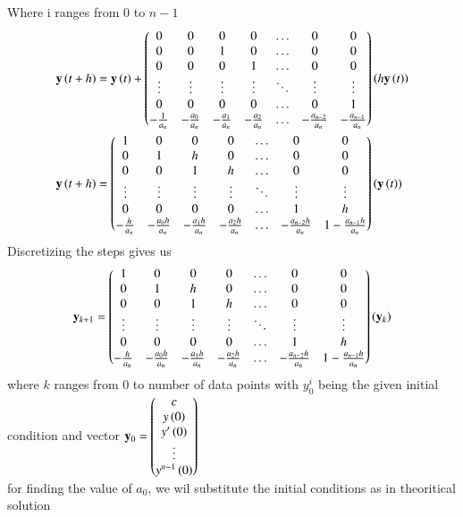 \documentclass[journal]{IEEEtran}
\begin{document}
Where i ranges from 0 to $n-1$\\
\begin{align}
	\mathbf{y}\left(t+h\right) &= \mathbf{y}\left(t\right) + \begin{pmatrix}0 & 0 & 0 & 0 & \dots & 0 & 0\\ 0 & 0 & 1 & 0 & \dots & 0 & 0\\0 & 0 & 0 & 1 & \dots & 0 & 0\\\vdots & \vdots & \vdots & \vdots& \ddots & \vdots & \vdots\\
	0 & 0 & 0 & 0 & \dots & 0 & 1\\-\frac{1}{a_n} & -\frac{a_0}{a_n} & -\frac{a_1}{a_n} & -\frac{a_2}{a_n} & \dots & -\frac{a_{n-2}}{a_n} & -\frac{a_{n-1}}{a_n}\end{pmatrix}\left(h\mathbf{y}\left(t\right)\right)\\
	\mathbf{y}\left(t+h\right) &= \begin{pmatrix}1 & 0 & 0 & 0 & \dots & 0 & 0\\ 0 & 1 & h & 0 & \dots & 0 & 0\\0 & 0 & 1 & h & \dots & 0 & 0\\\vdots & \vdots & \vdots & \vdots& \ddots & \vdots & \vdots\\
	0 & 0 & 0 & 0 & \dots & 1 & h\\-\frac{h}{a_n} & -\frac{a_0h}{a_n} & -\frac{a_1h}{a_n} & -\frac{a_2h}{a_n} & \dots & -\frac{a_{n-2}h}{a_n} & 1-\frac{a_{n-1}h}{a_n}\end{pmatrix}\left(\mathbf{y}\left(t\right)\right)
\end{align}
Discretizing the steps gives us
\begin{align}
	\mathbf{y}_{k+1} = \begin{pmatrix}1 & 0 & 0 & 0 & \dots & 0 & 0\\ 0 & 1 & h & 0 & \dots & 0 & 0\\0 & 0 & 1 & h & \dots & 0 & 0\\\vdots & \vdots & \vdots & \vdots& \ddots & \vdots & \vdots\\
	0 & 0 & 0 & 0 & \dots & 1 & h\\-\frac{h}{a_n} & -\frac{a_0h}{a_n} & -\frac{a_1h}{a_n} & -\frac{a_2h}{a_n} & \dots & -\frac{a_{n-2}h}{a_n} & 1-\frac{a_{n-1}h}{a_n}\end{pmatrix}\left(\mathbf{y}_{k}\right)
\end{align}
where $k$ ranges from 0 to number of data points with $y^{i}_0$ being the given initial condition and vector $\mathbf{y}_0 = \begin{pmatrix}c\\y\left(0\right)\\y^\prime\left(0\right)\\\vdots\\y^{n-1}\left(0\right)\end{pmatrix}$\\
for finding the value of $a_0$, we wil substitute the initial conditions as in theoritical solution\\
\end{document}
